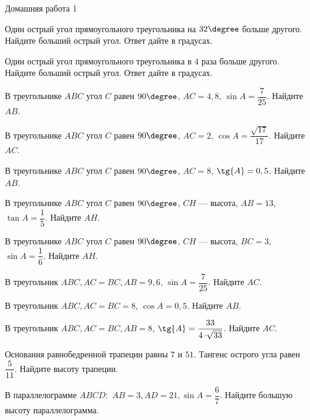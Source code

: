 \begin{class}[number=2]
\begin{listofex}
	\end{listofex}
\end{class}

\begin{homework}[number=1]
	\begin{listofex}
		\item Домашняя работа 1
	\end{listofex}
\end{homework}

\begin{class}[number=3]
	\begin{listofex}
		\item Один острый угол прямоугольного треугольника на \( 32\degree \) больше другого. Найдите больший острый угол. Ответ дайте в градусах.
		\item Один острый угол прямоугольного треугольника в \( 4 \) раза больше другого. Найдите больший острый угол. Ответ дайте в градусах.
		\item В треугольнике \(ABC\) угол \(C\) равен \(90 \degree \), \(AC=4,8\), \(\sin{A} = \dfrac{7}{25}\). Найдите \(AB\).
		\item В треугольнике \(ABC\) угол \(C\) равен \(90 \degree \), \(AC=2\), \(\cos{A} = \dfrac{\sqrt{17}}{17}\). Найдите \(AC\).
		\item В треугольнике \(ABC\) угол \(C\) равен \(90 \degree \), \(AC=8\), \(\tg{A} = 0,5\). Найдите \(AB\).
		\item В треугольнике \(ABC\) угол \(C\) равен \(90 \degree \), \(CH\) --- высота, \(AB=13\), \(\tan{A} = \dfrac{1}{5}\). Найдите \(AH\).
		\item В треугольнике \(ABC\) угол \(C\) равен \(90 \degree \), \(CH\) --- высота, \(BC=3\), \(\sin{A} = \dfrac{1}{6}\). Найдите \(AH\).
		\item В треугольник \(ABC, AC = BC, AB = 9,6\), \( \sin{A}= \dfrac{7}{25} \). Найдите \(AC\).
		\item В треугольник \(ABC, AC = BC = 8\), \( \cos{A}= 0,5 \). Найдите \(AB\).
		\item В треугольник \(ABC, AC = BC, AB = 8\), \( \tg{A}= \dfrac{33}{4 \cdot \sqrt[]{33}} \). Найдите \(AC\).
		\item Основания равнобедренной трапеции равны \(7\) и \(51\). Тангенс острого угла равен \( \dfrac{ 5 }{ 11 } \).  Найдите высоту трапеции.
		\item В параллелограмме \( ABCD: \) \( AB  =  3, AD  =  21, \sin A = \dfrac{ 6 }{ 7 } \). Найдите большую высоту параллелограмма.

\end{listofex}
\end{class}
